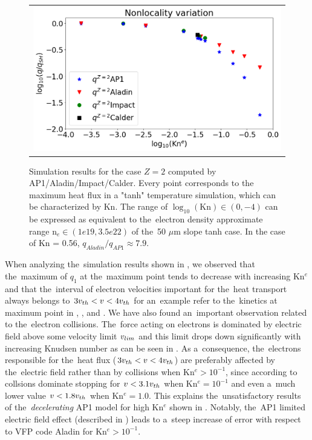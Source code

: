 \begin{figure}[htb]
  \begin{center}
    \begin{tabular}{c}
      \includegraphics[width=\figscale\textwidth]{Kn_results.png}
    \end{tabular}
  \caption{  
  Simulation results for the case $Z=2$ computed by AP1/Aladin/Impact/Calder.
  Every point corresponds to the maximum heat flux in a "tanh" temperature 
  simulation, which can be characterized by Kn. The range of 
  $\log_{10}(\text{Kn})\in (0, -4)$ can be expressed as equivalent 
  to the~electron density approximate range n$_e \in (1e19, 3.5e22)$ of 
  the~50 $\mu$m slope tanh case. In the case of Kn = 0.56, 
  $q_{Aladin} / q_{AP1}\approx 7.9$.}
  \label{fig:Kn_results}
  \end{center} 
\end{figure}
When analyzing the~simulation results shown in , 
we observed that 
the~maximum of $q_1$ at the~maximum point tends to decrease with increasing 
Kn$^e$ and that the~interval of electron velocities important for 
the~heat transport always belongs to $3 v_{th} < v <4 v_{th}$ for an~example
refer to the~kinetics at maximum point in , 
, and . 
We have also found 
an~important observation related to the~electron collisions.
The~force acting on electrons is dominated by
electric field above some velocity limit $v_{lim}$ and this limit drops 
down significantly with increasing Knudsen number as can be seen 
in . 
As a~consequence, the~electrons responsible for the~heat flux
($3 v_{th} < v <4 v_{th}$) are preferably affected by the~electric field
rather than by collisions when Kn$^{e} > 10^{-1}$, since according to 
 collsions dominate stopping for $v < 3.1 v_{th}$ 
when Kn$^e = 10^{-1}$ and even a~much lower value $v < 1.8 v_{th}$ 
when Kn$^e = 1.0$. This explains the~unsatisfactory results of 
the~\textit{decelerating} AP1
model for high Kn$^e$ shown in . 
Notably, the~AP1 limited electric field effect (described in 
) leads to a~steep increase of error with respect 
to VFP code Aladin for Kn$^e > 10^{-1}$.

